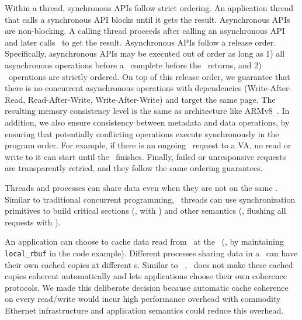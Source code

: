 Within a thread, synchronous APIs follow strict ordering.
An application thread that calls a synchronous API blocks until it gets the result.
Asynchronous APIs are non-blocking. A calling thread proceeds after calling an asynchronous API and later calls \poll\ to get the result. 
Asynchronous APIs follow a release order.
Specifically, asynchronous APIs may be executed out of order as long as
1) all asynchronous operations before a \release\ complete before the \release\ returns,
and 2) \release\ operations are strictly ordered.
On top of this release order, 
we guarantee that there is no concurrent asynchronous operations with dependencies (Write-After-Read, Read-After-Write, Write-After-Write) and target the same page.
The resulting memory consistency level is the same as architecture like ARMv8~\cite{ARMv8}.
In addition, we also ensure consistency between metadata and data operations, by ensuring that potentially conflicting operations execute synchronously in the program order. For example, if there is an ongoing \sysfree\ request to a VA, no read or write to it can start until the \sysfree\ finishes.
Finally, failed or unresponsive requests are transparently retried, and they follow the same ordering guarantees.



Threads and processes can share data even when they are not on the same \CN.
Similar to traditional concurrent programming, \sys\ threads can use synchronization primitives to build critical sections (\eg, with \syslock) 
and other semantics (\eg, flushing all requests with \fence).

An application can choose to cache data read from \Cliosysread\ at the \CN\ (\eg, by maintaining \texttt{local\_rbuf} in the code example).
Different processes sharing data in a \rspace\ can have their own cached copies at different \CN{}s.
Similar to ~\cite{Shan18-OSDI}, \sys\ does not make these cached copies coherent automatically and lets applications choose their own coherence
protocols.
We made this deliberate decision because automatic cache coherence on every read/write would incur  high performance overhead with commodity Ethernet infrastructure
and application semantics could reduce this overhead.

